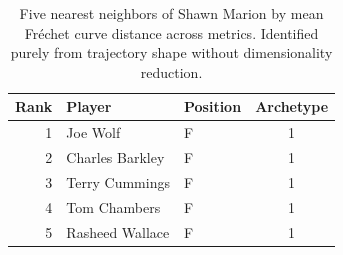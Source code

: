 \begin{table}[htbp]
  \centering\small
  \begin{tabular}{rllc}
    \toprule
    Rank & Player & Position & Archetype \\
    \midrule
    1 & Joe Wolf & F & 1 \\
    2 & Charles Barkley & F & 1 \\
    3 & Terry Cummings & F & 1 \\
    4 & Tom Chambers & F & 1 \\
    5 & Rasheed Wallace & F & 1 \\
    \bottomrule
  \end{tabular}
  \caption{Five nearest neighbors of Shawn Marion by mean Fr\'{e}chet curve distance across metrics. Identified purely from trajectory shape without dimensionality reduction.}
  \label{tab:Shawn_Marion_frechet_curve_neighbors}
\end{table}

